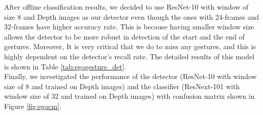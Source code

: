 After offline classification results, we decided to use ResNet-10 with window of size 8 and Depth images as our detector even though the ones with 24-frames and 32-frames have higher accuracy rate. This is because having smaller window size allows the detector to be more robust in detection of the start and the end of gestures. Moreover, It is very critical that we do to miss any gestures, and this is highly dependent on the detector's recall rate. The detailed results of this model is shown in Table \ref{tab:egogesture_det}. \\

Finally, we investigated the performance of the detector (ResNet-10 with window size of 8 and trained on Depth images) and the classifier (ResNext-101 with window size of 32 and trained on Depth images) with confusion matrix shown in Figure \ref{fig:egocm}.\\
\clearpage

